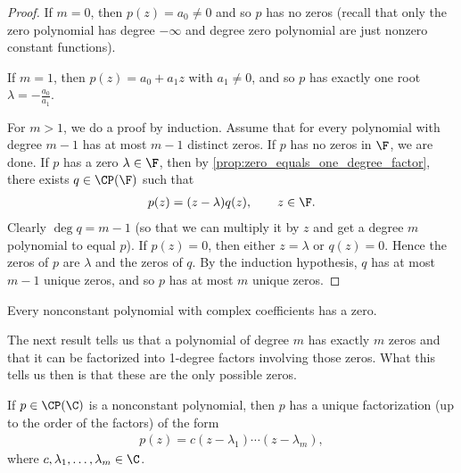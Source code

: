 \documentclass{article}
\begin{document}
\begin{proof}
  If $m = 0$, then $p(z) = a_0 \neq 0$ and so $p$ has no zeros (recall that only the zero polynomial has degree $-\infty$ and degree zero polynomial are just nonzero constant functions). 

  If $m = 1$, then $p(z) = a_0 + a_1z$ with $a_1 \neq 0$, and so $p$ has exactly one root $\lambda = -\frac{a_0}{a_1}$.

  For $m > 1$, we do a proof by induction. Assume that for every polynomial with degree $m - 1$ has at most $m - 1$ distinct zeros. If $p$ has no zeros in $\F$, we are done. If $p$ has a
  zero $\lambda \in \F$, then by \eqref{prop:zero_equals_one_degree_factor}, there exists $q \in \CP(\F)$ such that
  \begin{align*}
    p(z) = (z - \lambda)q(z), \qquad z \in \F.
  \end{align*}
  Clearly $\deg{q} = m - 1$ (so that we can multiply it by $z$ and get a degree $m$ polynomial to equal $p$). If $p(z) = 0$, then either $z = \lambda$ or $q(z) = 0$. Hence the zeros of $p$
  are $\lambda$ and the zeros of $q$. By the induction hypothesis, $q$ has at most $m - 1$ unique zeros, and so $p$ has at most $m$ unique zeros.
\end{proof}
\begin{thm}
  Every nonconstant polynomial with complex coefficients has a zero.
\end{thm}
The next result tells us that a polynomial of degree $m$ has exactly $m$ zeros and that it can be factorized into 1-degree factors involving those zeros. What this tells us then is that
these are the only possible zeros.
\begin{prop}\label{prop:polynomial_factorization}
  If $p \in \CP(\C)$ is a nonconstant polynomial, then $p$ has a unique factorization (up to the order of the factors) of the form
  \begin{align*}
    p(z) = c(z - \lambda_1)\cdots(z - \lambda_m),
  \end{align*}
  where $c, \lambda_1, \dots, \lambda_m \in \C$.
\end{prop}
\end{document}
